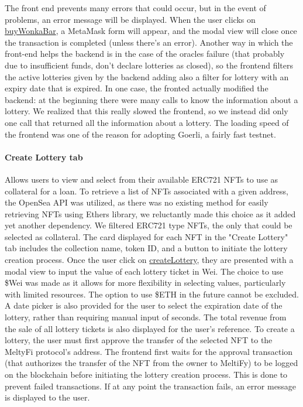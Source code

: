 The front end prevents many errors that could occur, but in the event of problems, an error message will be displayed.
When the user clicks on \href{https://goerli.etherscan.io/tx/0xa8017555c918384405794472eb8559144dc563cc427703b9cb5e310c4aab6222}{buyWonkaBar}, a MetaMask form will appear, and the modal view will close once the transaction is completed (unless there's an error).
Another way in which the front-end helps the backend is in the case of the oracles failure (that probably due to insufficient funds, don't declare lotteries as closed), so the frontend filters the active lotteries given by the backend adding also a filter for lottery with an expiry date that is expired.
In one case, the fronted actually modified the backend: at the beginning there were many calls to know the information about a lottery. We realized that this really slowed the frontend, so we instead did only one call that returned all the information about a lottery. The loading speed of the frontend was one of the reason for adopting Goerli, a fairly fast testnet.
\paragraph{Create Lottery tab} Allows users to view and select from their available ERC721 NFTs to use as collateral for a loan. To retrieve a list of NFTs associated with a given address, the OpenSea API was utilized, as there was no existing method for easily retrieving NFTs using Ethers library, we reluctantly made this choice as it added yet another dependency. We filtered ERC721 type NFTs, the only that could be selected as collateral.
The card displayed for each NFT in the "Create Lottery" tab includes the collection name, token ID, and a button to initiate the lottery creation process. Once the user click on \href{https://goerli.etherscan.io/tx/0xe68f3f68b00dce4c299d0205dfbc72c302ae4d5e089b16d3c024755db70ffdf3}{createLottery}, they are presented with a modal view to input the value of each lottery ticket in Wei. The choice to use \$Wei was made as it allows for more flexibility in selecting values, particularly with limited resources. The option to use \$ETH in the future cannot be excluded. A date picker is also provided for the user to select the expiration date of the lottery, rather than requiring manual input of seconds. The total revenue from the sale of all lottery tickets is also displayed for the user's reference. To create a lottery, the user must first approve the transfer of the selected NFT to the MeltyFi protocol's address. The frontend first waits for the approval transaction (that authorizes the transfer of the NFT from the owner to MeltiFy) to be logged on the blockchain before initiating the lottery creation process. This is done to prevent failed transactions. If at any point the transaction fails, an error message is displayed to the user.


